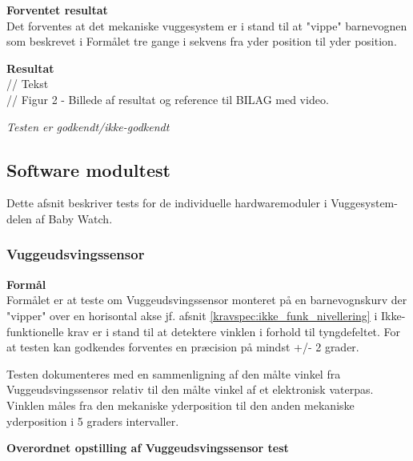 \textbf{Forventet resultat} \\
Det forventes at det mekaniske vuggesystem er i stand til at "vippe" barnevognen som beskrevet i Formålet tre gange i sekvens fra yder position til yder position.

\textbf{Resultat} \\
// Tekst \\

// Figur 2 - Billede af resultat og reference til BILAG med video.

\textit{Testen er godkendt/ikke-godkendt}




\subsection{Software modultest}
Dette afsnit beskriver tests for de individuelle hardwaremoduler i Vuggesystem-delen af Baby Watch.
\subsubsection{Vuggeudsvingssensor}
\textbf{Formål} \\
Formålet er at teste om Vuggeudsvingssensor monteret på en barnevognskurv der "vipper" over en horisontal akse jf. afsnit \vref{kravspec:ikke_funk_nivellering} i Ikke-funktionelle krav er i stand til at detektere vinklen i forhold til tyngdefeltet. For at testen kan godkendes forventes en præcision på mindst +/- 2 grader.

Testen dokumenteres med en sammenligning af den målte vinkel fra Vuggeudsvingssensor relativ til den målte vinkel af et elektronisk vaterpas. Vinklen måles fra den mekaniske yderposition til den anden mekaniske yderposition i 5 graders intervaller.

\textbf{Overordnet opstilling af Vuggeudsvingssensor test}

